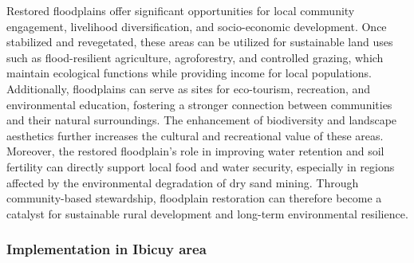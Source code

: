 Restored floodplains offer significant opportunities for local community engagement, livelihood diversification, and socio-economic development. Once stabilized and revegetated, these areas can be utilized for sustainable land uses such as flood-resilient agriculture, agroforestry, and controlled grazing, which maintain ecological functions while providing income for local populations. Additionally, floodplains can serve as sites for eco-tourism, recreation, and environmental education, fostering a stronger connection between communities and their natural surroundings. The enhancement of biodiversity and landscape aesthetics further increases the cultural and recreational value of these areas. Moreover, the restored floodplain’s role in improving water retention and soil fertility can directly support local food and water security, especially in regions affected by the environmental degradation of dry sand mining. Through community-based stewardship, floodplain restoration can therefore become a catalyst for sustainable rural development and long-term environmental resilience.

\subsubsection{Implementation in Ibicuy area}

